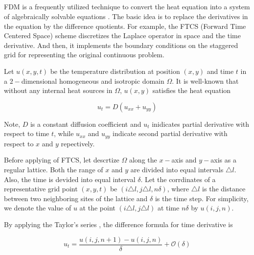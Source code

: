 
\subsection{}

FDM is a frequently utilized technique to convert the heat equation
into a system of algebraically solvable equations
\cite{grossmann2007numerical}. The basic idea is to replace the
derivatives in the equation by the difference quotients. For example,
the FTCS (Forward Time Centered Space) scheme
\cite{pletcher2012computational} discretizes the Laplace operator in
space and the time derivative. And then, it implements the boundary
conditions on the staggered grid for representing the original
continuous problem.


Let $u(x, y, t)$ be the temperature distribution at position $(x, y)$
and time $t$ in a $2-$dimensional homogeneous and isotropic domain
$\Omega$. It is well-known that without any internal heat sources in
$\Omega$, $u(x,y)$ satisfies the heat equation

\begin{equation}\label{eq:Cartesian_heat_equation}
  u_t = D \left(u_{xx} + u_{yy}\right)
\end{equation}

Note, $D$ is a constant diffusion coefficient and $u_t$ inidicates
partial derivative with respect to time $t$, while $u_{xx}$ and
$u_{yy}$ indicate second partial derivative with respect to $x$ and
$y$ repectively.

Before applying of FTCS, let descrtize $\Omega$ along the $x-$axis and
$y-$axis as a regular lattice. Both the range of $x$ and $y$ are
divided into equal intervals $\triangle l$. Also, the time is devided
into equal interval $\delta$. Let the corrdinates of a representative
grid point $(x, y, t)$ be $(i \triangle l, j \triangle l, n \delta)$,
where $\triangle l$ is the distance between two neighboring sites of
the lattice and $\delta$ is the time step. For simplicity, we denote
the value of $u$ at the point $(i \triangle l, j \triangle l)$ at time
$n \delta$ by $u(i, j, n)$.

By applying the Taylor's series \cite{taylor1715methodus}, the
difference formula for time derivative is

\begin{equation}\label{eq:time_difference}
  u_t = \frac{u(i, j, n+1) - u(i, j, n)}{\delta} + \mathcal{O}(\delta)
\end{equation}

